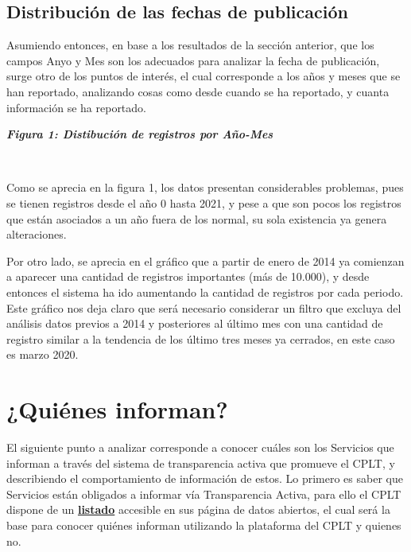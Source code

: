 \documentclass[11pt]{article}
\begin{document}
    \hypertarget{distribuciuxf3n-de-las-fechas-de-publicaciuxf3n}{%
\subsection{Distribución de las fechas de
publicación}\label{distribuciuxf3n-de-las-fechas-de-publicaciuxf3n}}

Asumiendo entonces, en base a los resultados de la sección anterior, que
los campos Anyo y Mes son los adecuados para analizar la fecha de
publicación, surge otro de los puntos de interés, el cual corresponde a
los años y meses que se han reportado, analizando cosas como desde
cuando se ha reportado, y cuanta información se ha reportado.

    \textbf{\emph{Figura 1: Distibución de registros por Año-Mes}}

    
    \begin{center}
    \end{center}
    { \hspace*{\fill} \\}
    
    Como se aprecia en la figura 1, los datos presentan considerables
problemas, pues se tienen registros desde el año 0 hasta 2021, y pese a
que son pocos los registros que están asociados a un año fuera de los
normal, su sola existencia ya genera alteraciones.

Por otro lado, se aprecia en el gráfico que a partir de enero de 2014 ya
comienzan a aparecer una cantidad de registros importantes (más de
10.000), y desde entonces el sistema ha ido aumentando la cantidad de
registros por cada periodo. Este gráfico nos deja claro que será
necesario considerar un filtro que excluya del análisis datos previos a
2014 y posteriores al último mes con una cantidad de registro similar a
la tendencia de los último tres meses ya cerrados, en este caso es marzo
2020.

    \hypertarget{quiuxe9nes-informan}{%
\section{¿Quiénes informan?}\label{quiuxe9nes-informan}}

El siguiente punto a analizar corresponde a conocer cuáles son los
Servicios que informan a través del sistema de transparencia activa que
promueve el CPLT, y describiendo el comportamiento de información de
estos. Lo primero es saber que Servicios están obligados a informar vía
Transparencia Activa, para ello el CPLT dispone de un
\textbf{\href{https://www.portaltransparencia.cl/PortalPdT/web/guest/opendata\#_48_INSTANCE_GI66ozEZ7DNy_=dataset\%2Forganismos\%2Fresource\%2F527e355d-f401-48c7-b984-2d2971db9713}{listado}}
accesible en sus página de datos abiertos, el cual será la base para
conocer quiénes informan utilizando la plataforma del CPLT y quienes no.
\end{document}
